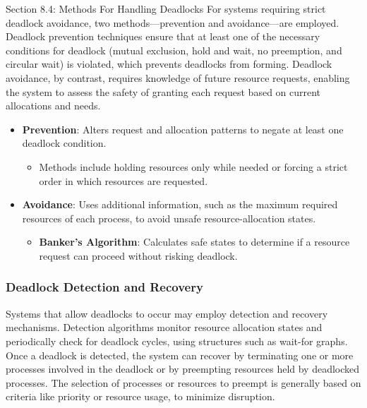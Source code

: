 \begin{notes}{Section 8.4: Methods For Handling Deadlocks}
    For systems requiring strict deadlock avoidance, two methods—prevention and avoidance—are employed. Deadlock prevention techniques ensure that at least one of the necessary conditions for deadlock 
    (mutual exclusion, hold and wait, no preemption, and circular wait) is violated, which prevents deadlocks from forming. Deadlock avoidance, by contrast, requires knowledge of future resource requests, 
    enabling the system to assess the safety of granting each request based on current allocations and needs.
    
    \begin{highlight}
    
        \begin{itemize}
            \item \textbf{Prevention}: Alters request and allocation patterns to negate at least one deadlock condition. 
                \begin{itemize}
                    \item Methods include holding resources only while needed or forcing a strict order in which resources are requested.
                \end{itemize}
            \item \textbf{Avoidance}: Uses additional information, such as the maximum required resources of each process, to avoid unsafe resource-allocation states.
                \begin{itemize}
                    \item \textbf{Banker's Algorithm}: Calculates safe states to determine if a resource request can proceed without risking deadlock.
                \end{itemize}
        \end{itemize}
    
    \end{highlight}
    
    \subsubsection*{Deadlock Detection and Recovery}
    
    Systems that allow deadlocks to occur may employ detection and recovery mechanisms. Detection algorithms monitor resource allocation states and periodically check for deadlock cycles, using structures 
    such as wait-for graphs. Once a deadlock is detected, the system can recover by terminating one or more processes involved in the deadlock or by preempting resources held by deadlocked processes. The 
    selection of processes or resources to preempt is generally based on criteria like priority or resource usage, to minimize disruption.
    

\end{notes}
